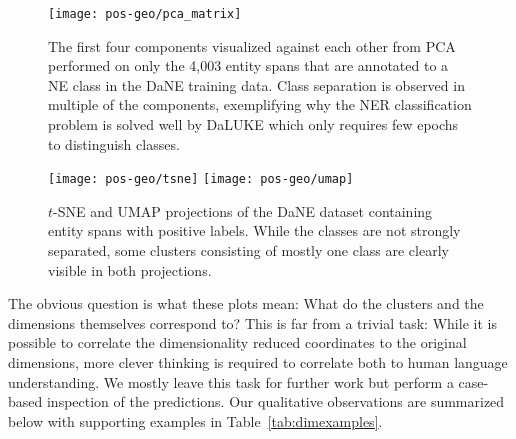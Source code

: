 \documentclass[main.tex]{subfiles}
\begin{document}
\begin{figure}[H]
    \centering
        \texttt{[image: pos-geo/pca\_matrix]}
    \caption{
        The first four components visualized against each other from PCA performed on only the 4,003 entity spans that are annotated to a NE class in the DaNE training data.
        Class separation is observed in multiple of the components, exemplifying why the NER classification problem is solved well by DaLUKE which only requires few epochs to distinguish classes.
    }
    \label{fig:pos-pca}
\end{figure}\noindent

\begin{figure}[H]
    \centering
        \texttt{[image: pos-geo/tsne]}
        \texttt{[image: pos-geo/umap]}
    \caption{
        $t$-SNE and UMAP projections of the DaNE dataset containing entity spans with positive labels.
        While the classes are not strongly separated, some clusters consisting of mostly one class are clearly visible in both projections.
    }
    \label{fig:pos-tsne}
\end{figure}\noindent
The obvious question is what these plots mean: What do the clusters and the dimensions themselves correspond to?
This is far from a trivial task: While it is possible to correlate the dimensionality reduced coordinates to the original dimensions, more clever thinking is required to correlate both to human language understanding.
We mostly leave this task for further work but perform a case-based inspection of the predictions.
Our qualitative observations are summarized below with supporting examples in Table~\ref{tab:dimexamples}.
\end{document}

